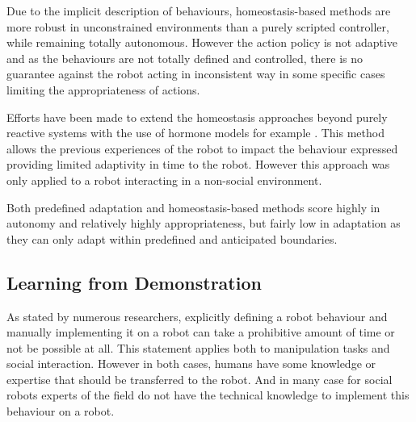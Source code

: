 	Due to the implicit description of behaviours, homeostasis-based methods are more robust in unconstrained environments than a purely scripted controller, while remaining totally autonomous. However the action policy is not adaptive and as the behaviours are not totally defined and controlled, there is no guarantee against the robot acting in inconsistent way in some specific cases limiting the appropriateness of actions.

	Efforts have been made to extend the homeostasis approaches beyond purely reactive systems with the use of hormone models for example \citep{Lones2014}. This method allows the previous experiences of the robot to impact the behaviour expressed providing limited adaptivity in time to the robot. However this approach was only applied to a robot interacting in a non-social environment.
	
	Both predefined adaptation and homeostasis-based methods score highly in autonomy and relatively highly appropriateness, but fairly low in adaptation as they can only adapt within predefined and anticipated boundaries.

\subsection{Learning from Demonstration} \label{ssec:back_lfd}
	As stated by numerous researchers, explicitly defining a robot behaviour and manually implementing it on a robot can take a prohibitive amount of time or not be possible at all. This statement applies both to manipulation tasks and social interaction. However in both cases, humans have some knowledge or expertise that should be transferred to the robot. And in many case for social robots experts of the field do not have the technical knowledge to implement this behaviour on a robot. 
	
	    
